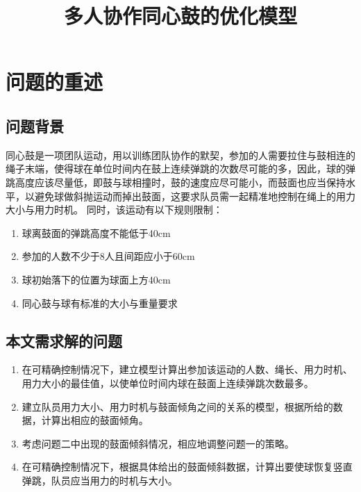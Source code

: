 \documentclass[withoutpreface,bwprint]{cumcmthesis} %
\title{多人协作同心鼓的优化模型}
\begin{document}
 \maketitle
 \begin{abstract}






\end{abstract}


\section{问题的重述}
\subsection{问题背景}

同心鼓是一项团队运动，用以训练团队协作的默契，参加的人需要拉住与鼓相连的绳子末端，使得球在单位时间内在鼓上连续弹跳的次数尽可能的多，因此，球的弹跳高度应该尽量低，即鼓与球相撞时，鼓的速度应尽可能小，而鼓面也应当保持水平，以避免球做斜抛运动而掉出鼓面，这要求队员需一起精准地控制在绳上的用力大小与用力时机。
同时，该运动有以下规则限制：
\begin{enumerate}
    \item 球离鼓面的弹跳高度不能低于40cm
    \item 参加的人数不少于8人且间距应小于60cm
    \item 球初始落下的位置为球面上方40cm
    \item 同心鼓与球有标准的大小与重量要求
\end{enumerate}


\subsection{本文需求解的问题}
\begin{enumerate}
    \item 在可精确控制情况下，建立模型计算出参加该运动的人数、绳长、用力时机、用力大小的最佳值，以使单位时间内球在鼓面上连续弹跳次数最多。
    \item 建立队员用力大小、用力时机与鼓面倾角之间的关系的模型，根据所给的数据，计算出相应的鼓面倾角。
    \item 考虑问题二中出现的鼓面倾斜情况，相应地调整问题一的策略。
    \item 在可精确控制情况下，根据具体给出的鼓面倾斜数据，计算出要使球恢复竖直弹跳，队员应当用力的时机与大小。
\end{enumerate}
\end{document}
